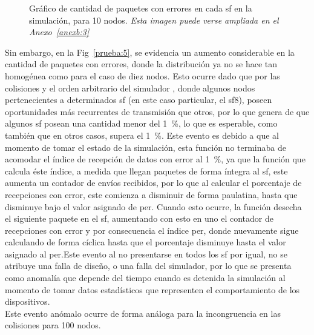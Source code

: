\begin{justify}
\begin{figure}[!ht]
\caption{Gráfico de cantidad de paquetes con errores en cada \gls{sf} en la simulación, para 10 nodos. \textit{Esta imagen puede verse ampliada en el Anexo~\ref{anexb:3}}}
\label{prueba:4}
\end{figure}\newpage \noindent
Sin embargo, en la Fig~\ref{prueba:5}, se evidencia un aumento considerable en la cantidad de paquetes con errores, donde la distribución ya no se hace tan homogénea como para el caso de diez nodos. Esto ocurre dado que por las colisiones y el orden arbitrario del simulador \OMNET, donde algunos nodos pertenecientes a determinados \gls{sf} (en este caso particular, el \gls{sf}\num{8}), poseen oportunidades más recurrentes de transmisión que otros, por lo que genera de que algunos \gls{sf} posean una cantidad menor del \SI{1}{\percent}, lo que es esperable, como también que en otros casos, supera el \SI{1}{\percent}. Este evento es debido a que al momento de tomar el estado de la simulación, esta función no terminaba de acomodar el índice de recepción de datos con error al \SI{1}{\percent}, ya que la función que calcula éste índice, a medida que llegan paquetes de forma íntegra al \gls{sf}, este aumenta un contador de envíos recibidos, por lo que al calcular el porcentaje de recepciones con error, este comienza a disminuir de forma paulatina, hasta que disminuye bajo el valor asignado de \gls{per}. Cuando esto ocurre, la función desecha el siguiente paquete en el \gls{sf}, aumentando con esto en uno el contador de recepciones con error y por consecuencia el índice \gls{per}, donde nuevamente sigue calculando de forma cíclica hasta que el porcentaje disminuye hasta el valor asignado al \gls{per}.\newpage \noindent Este evento al no presentarse en todos los \gls{sf} por igual, no se atribuye una falla de diseño, o una falla del simulador, por lo que se presenta como anomalía que depende del tiempo cuando es detenida la simulación al momento de tomar datos estadísticos que representen el comportamiento de los dispositivos.\\
Este evento anómalo ocurre de forma análoga para la incongruencia en las colisiones para 100 nodos.


\end{justify}
